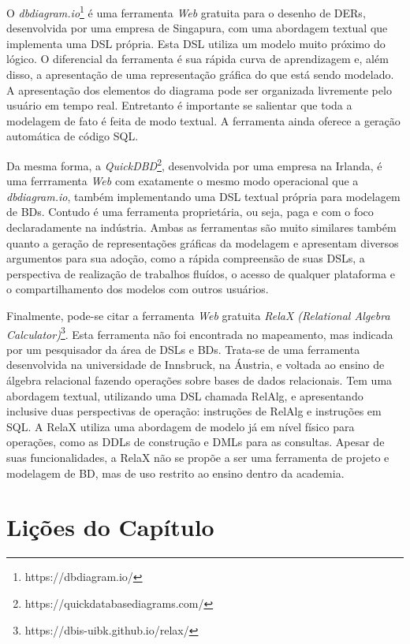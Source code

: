 O \textit{dbdiagram.io}\footnote{https://dbdiagram.io/} é uma ferramenta \textit{Web} gratuita para o desenho de \acp{DER}, desenvolvida por uma empresa de Singapura, com uma abordagem textual que implementa uma \ac{DSL} própria.
Esta \ac{DSL} utiliza um modelo muito próximo do lógico. 
O diferencial da ferramenta é sua rápida curva de aprendizagem e, além disso, a apresentação de uma representação gráfica do que está sendo modelado.
A apresentação dos elementos do diagrama pode ser organizada livremente pelo usuário em tempo real. 
Entretanto é importante se salientar que toda a modelagem de fato é feita de modo textual. 
A ferramenta ainda oferece a geração automática de código \ac{SQL}.

Da mesma forma, a \textit{QuickDBD}\footnote{https://quickdatabasediagrams.com/}, desenvolvida por uma empresa na Irlanda, é uma ferrramenta \textit{Web} com exatamente o mesmo modo operacional que a \textit{dbdiagram.io}, também implementando uma \ac{DSL} textual própria para modelagem de \acp{BD}.
Contudo é uma ferramenta proprietária, ou seja, paga e com o foco declaradamente na indústria. 
Ambas as ferramentas são muito similares também quanto a geração de representações gráficas da modelagem e apresentam diversos argumentos para sua adoção, como a rápida compreensão de suas \acp{DSL}, a perspectiva de realização de trabalhos fluídos, o acesso de qualquer plataforma e o compartilhamento dos modelos com outros usuários.

Finalmente, pode-se citar a ferramenta \textit{Web} gratuita \textit{RelaX (Relational Algebra Calculator)}\footnote{https://dbis-uibk.github.io/relax/}. 
Esta ferramenta não foi encontrada no mapeamento, mas indicada por um pesquisador da área de \acp{DSL} e \acp{BD}. 
Trata-se de uma ferramenta desenvolvida na universidade de Innsbruck, na Áustria, e voltada ao ensino de álgebra relacional fazendo operações sobre bases de dados relacionais. 
Tem uma abordagem textual, utilizando uma \ac{DSL} chamada RelAlg, e apresentando inclusive duas perspectivas de operação: instruções de RelAlg e instruções em \ac{SQL}. 
A RelaX utiliza uma abordagem de modelo já em nível físico para operações, como as \acp{DDL} de construção e \acp{DML} para as consultas. 
Apesar de suas funcionalidades, a RelaX não se propõe a ser uma ferramenta de projeto e modelagem de \ac{BD}, mas de uso restrito ao ensino dentro da academia.

\section{Lições do Capítulo} \label{sec:LicoesMapeamento}

